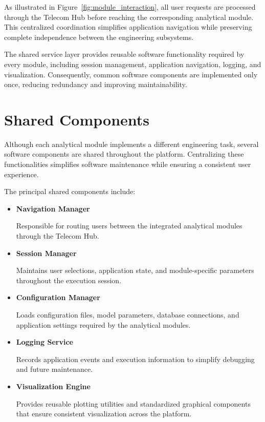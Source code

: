 
As illustrated in Figure~\ref{fig:module_interaction}, all user requests are processed through the Telecom Hub before reaching the corresponding analytical module. This centralized coordination simplifies application navigation while preserving complete independence between the engineering subsystems.

The shared service layer provides reusable software functionality required by every module, including session management, application navigation, logging, and visualization. Consequently, common software components are implemented only once, reducing redundancy and improving maintainability.

\section{Shared Components}

Although each analytical module implements a different engineering task, several software components are shared throughout the platform. Centralizing these functionalities simplifies software maintenance while ensuring a consistent user experience.

The principal shared components include:

\begin{itemize}

\item \textbf{Navigation Manager}

Responsible for routing users between the integrated analytical modules through the Telecom Hub.

\item \textbf{Session Manager}

Maintains user selections, application state, and module-specific parameters throughout the execution session.

\item \textbf{Configuration Manager}

Loads configuration files, model parameters, database connections, and application settings required by the analytical modules.

\item \textbf{Logging Service}

Records application events and execution information to simplify debugging and future maintenance.

\item \textbf{Visualization Engine}

Provides reusable plotting utilities and standardized graphical components that ensure consistent visualization across the platform.

\end{itemize}

